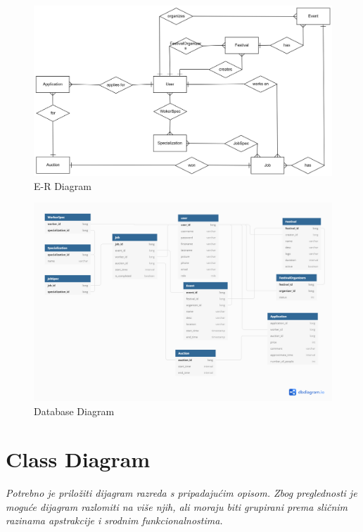 				
				\begin{figure}[H]
					\includegraphics[width=\linewidth]{diagrams/db_er_diag.png}
					\centering
					\caption{E-R Diagram}
					\label{fig:er_diag}
				\end{figure}
			
				\begin{figure}[H]
					\includegraphics[width=\linewidth]{diagrams/db_normal_diag.png}
					\centering
					\caption{Database Diagram}
					\label{fig:normal_diag}
				\end{figure}
			
			\eject
			
			\pagebreak
		\section{Class Diagram}
		
			\textit{Potrebno je priložiti dijagram razreda s pripadajućim opisom. Zbog preglednosti je moguće dijagram razlomiti na više njih, ali moraju biti grupirani prema sličnim razinama apstrakcije i srodnim funkcionalnostima.}\\
			
